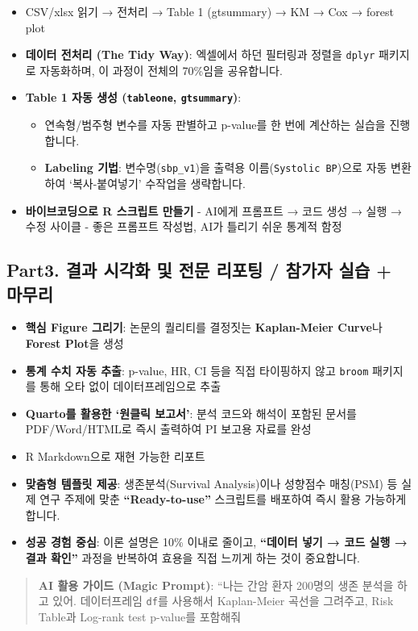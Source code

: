\documentclass[
  letterpaper,
  DIV=11,
  numbers=noendperiod]{scrartcl}
\providecommand{\tightlist}{%
  \setlength{\itemsep}{0pt}\setlength{\parskip}{0pt}}
\begin{document}
\begin{itemize}
\tightlist
\item
  CSV/xlsx 읽기 → 전처리 → Table 1 (gtsummary) → KM → Cox → forest plot
\item
  \textbf{데이터 전처리 (The Tidy Way)}: 엑셀에서 하던 필터링과 정렬을
  \texttt{dplyr} 패키지로 자동화하며, 이 과정이 전체의 70\%임을
  공유합니다.
\item
  \textbf{Table 1 자동 생성 (\texttt{tableone}, \texttt{gtsummary})}:

  \begin{itemize}
  \tightlist
  \item
    연속형/범주형 변수를 자동 판별하고 p-value를 한 번에 계산하는 실습을
    진행합니다.
  \item
    \textbf{Labeling 기법}: 변수명(\texttt{sbp\_v1})을 출력용
    이름(\texttt{Systolic\ BP})으로 자동 변환하여 `복사-붙여넣기'
    수작업을 생략합니다.
  \end{itemize}
\item
  \textbf{바이브코딩으로 R 스크립트 만들기} - AI에게 프롬프트 → 코드
  생성 → 실행 → 수정 사이클 - 좋은 프롬프트 작성법, AI가 틀리기 쉬운
  통계적 함정
\end{itemize}

\subsection{Part3. 결과 시각화 및 전문 리포팅 / 참가자 실습 +
마무리}\label{part3.-uxacb0uxacfc-uxc2dcuxac01uxd654-uxbc0f-uxc804uxbb38-uxb9acuxd3ecuxd305-uxcc38uxac00uxc790-uxc2e4uxc2b5-uxb9c8uxbb34uxb9ac}

\begin{itemize}
\tightlist
\item
  \textbf{핵심 Figure 그리기}: 논문의 퀄리티를 결정짓는
  \textbf{Kaplan-Meier Curve}나 \textbf{Forest Plot}을 생성
\item
  \textbf{통계 수치 자동 추출}: p-value, HR, CI 등을 직접 타이핑하지
  않고 \texttt{broom} 패키지를 통해 오타 없이 데이터프레임으로 추출
\item
  \textbf{Quarto를 활용한 `원클릭 보고서'}: 분석 코드와 해석이 포함된
  문서를 PDF/Word/HTML로 즉시 출력하여 PI 보고용 자료를 완성
\item
  R Markdown으로 재현 가능한 리포트
\item
  \textbf{맞춤형 템플릿 제공}: 생존분석(Survival Analysis)이나 성향점수
  매칭(PSM) 등 실제 연구 주제에 맞춘 \textbf{``Ready-to-use''}
  스크립트를 배포하여 즉시 활용 가능하게 합니다.
\item
  \textbf{성공 경험 중심}: 이론 설명은 10\% 이내로 줄이고,
  \textbf{``데이터 넣기 → 코드 실행 → 결과 확인''} 과정을 반복하여
  효용을 직접 느끼게 하는 것이 중요합니다.
\end{itemize}

\begin{quote}
\textbf{AI 활용 가이드 (Magic Prompt)}: ``나는 간암 환자 200명의 생존
분석을 하고 있어. 데이터프레임 \texttt{df}를 사용해서 Kaplan-Meier
곡선을 그려주고, Risk Table과 Log-rank test p-value를 포함해줘
\end{quote}
\end{document}
